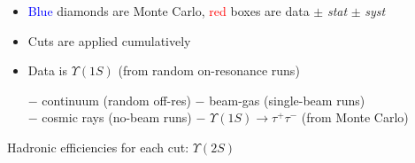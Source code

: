 \documentclass[landscape]{article}
\begin{document}
\begin{itemize}

\vfill
  \item \textcolor{blue}{Blue} diamonds are Monte Carlo, \textcolor{red}{red} boxes are data $\pm$ {\it stat} $\pm$ {\it syst}

\vfill
  \item Cuts are applied cumulatively

\vfill
  \item Data is $\Upsilon(1S)$ (from random on-resonance runs) \\

  \vspace{-0.7\baselineskip}
  \hspace{1 cm} \begin{minipage}{0.9\linewidth} $-$
  continuum (random off-res) $-$ beam-gas (single-beam runs) \\ $-$
  cosmic rays (no-beam runs) $-$ $\Upsilon(1S) \to \tau^+ \tau^-$ (from
  Monte Carlo) \end{minipage}

\end{itemize}

\vfill
\pagebreak

Hadronic efficiencies for each cut: $\Upsilon(2S)$
\vspace{1 cm}
\end{document}
